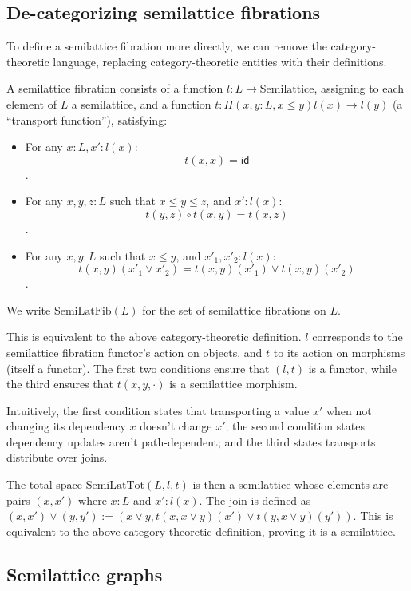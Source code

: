 \documentclass{article}
\begin{document}
    \subsection{De-categorizing semilattice fibrations}

      To define a semilattice fibration more directly, we can remove the category-theoretic language, replacing category-theoretic entities with their definitions.

      A semilattice fibration consists of a function $l : L \rightarrow \mathrm{Semilattice}$, assigning to each element of $L$ a semilattice, and a function $t : \Pi (x, y : L, x \leq y) l(x) \rightarrow l(y)$ (a ``transport function''), satisfying:

      \begin{itemize}
        \item For any $x : L, x' : l(x)$: $$t(x, x) = \mathsf{id}$$.
        \item For any $x, y, z : L$ such that $x \leq y \leq z$, and $x' : l(x)$: $$t(y, z) \circ t(x, y) = t(x, z)$$.
        \item For any $x, y : L$ such that $x \leq y$, and $x'_1, x'_2 : l(x)$: $$t(x, y)(x'_1 \vee x'_2) = t(x, y)(x'_1) \vee t(x, y)(x'_2)$$.
      \end{itemize}

      We write $\mathrm{SemiLatFib}(L)$ for the set of semilattice fibrations on $L$.

      This is equivalent to the above category-theoretic definition. $l$ corresponds to the semilattice fibration functor's action on objects, and $t$ to its action on morphisms (itself a functor). The first two conditions ensure that $(l, t)$ is a functor, while the third ensures that $t(x, y, \cdot)$ is a semilattice morphism.

      Intuitively, the first condition states that transporting a value $x'$ when not changing its dependency $x$ doesn't change $x'$; the second condition states dependency updates aren't path-dependent; and the third states transports distribute over joins.

      The total space $\mathrm{SemiLatTot}(L, l, t)$ is then a semilattice whose elements are pairs $(x, x')$ where $x : L$ and $x' : l(x)$. The join is defined as $(x, x') \vee (y, y') := (x \vee y, t(x, x \vee y)(x') \vee t(y, x \vee y)(y'))$. This is equivalent to the above category-theoretic definition, proving it is a semilattice.

    \subsection{Semilattice graphs}
\end{document}
